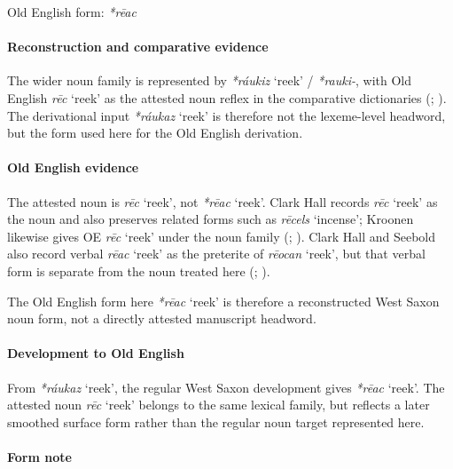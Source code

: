 \documentclass[
  british,
  a4paper,
]{article}
\providecommand{\Recon}[1]{\emph{*#1}}
\begin{document}
Old English form: \emph{*rēac}

\paragraph{Reconstruction and comparative
evidence}\label{reconstruction-and-comparative-evidence-145}

The wider noun family is represented by \Recon{ráukiz} `reek' /
{\emph{*rauki-}}, with Old English {\emph{rēc}} `reek' as the attested
noun reflex in the comparative dictionaries
(;
). The derivational input
\Recon{ráukaz} `reek' is therefore not the lexeme-level headword, but
the form used here for the Old English derivation.

\paragraph{Old English evidence}\label{old-english-evidence-145}

The attested noun is {\emph{rēc}} `reek', not \Recon{rēac} `reek'. Clark
Hall records {\emph{rēc}} `reek' as the noun and also preserves related
forms such as {\emph{rēcels}} `incense'; Kroonen likewise gives OE
{\emph{rēc}} `reek' under the noun family
(;
). Clark Hall and Seebold
also record verbal {\emph{rēac}} `reek' as the preterite of
{\emph{rēocan}} `reek', but that verbal form is separate from the noun
treated here (;
).

The Old English form here \Recon{rēac} `reek' is therefore a
reconstructed West Saxon noun form, not a directly attested manuscript
headword.

\paragraph{Development to Old
English}\label{development-to-old-english-145}

From \Recon{ráukaz} `reek', the regular West Saxon development gives
\Recon{rēac} `reek'. The attested noun {\emph{rēc}} `reek' belongs to
the same lexical family, but reflects a later smoothed surface form
rather than the regular noun target represented here.

\paragraph{Form note}\label{form-note-28}
\end{document}
